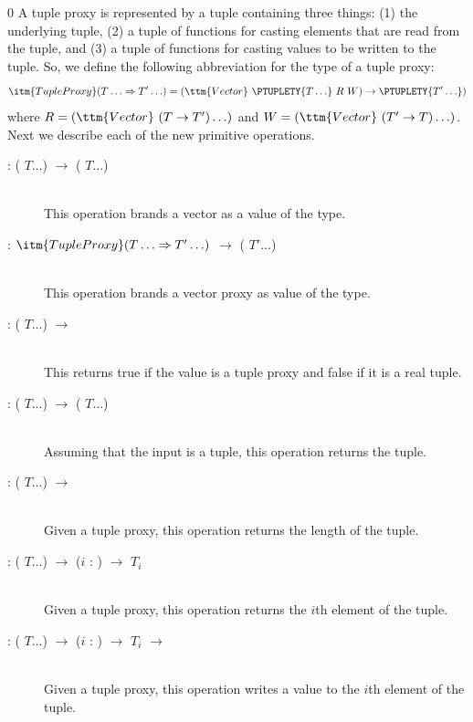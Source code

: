 \documentclass[7x10]{TimesAPriori_MIT}%
\def\racketEd{0}
\def\edition{1}
\numberwithin{theorem}{chapter}
\numberwithin{definition}{chapter}
\numberwithin{equation}{chapter}
\begin{document}
{\if\edition\racketEd    
A tuple proxy is represented by a tuple containing three things: (1) the
underlying tuple, (2) a tuple of functions for casting elements that
are read from the tuple, and (3) a tuple of functions for casting
values to be written to the tuple. So, we define the following
abbreviation for the type of a tuple proxy:
\[
\itm{TupleProxy} (T\ldots \Rightarrow T'\ldots)
= (\ttm{Vector}~\PTUPLETY{T\ldots} ~R~ W) \to \PTUPLETY{T' \ldots})
\]
where $R = (\ttm{Vector}~(T\to T') \ldots)$ and
$W = (\ttm{Vector}~(T'\to T) \ldots)$.
%
Next we describe each of the new primitive operations.

\begin{description}
\item[ : ( $T \ldots$) $\to$
  ( $T \ldots$)]\ \\
%
  This operation brands a vector as a value of the  type.
\item[ : $\itm{TupleProxy}(T\ldots \Rightarrow T'\ldots)$
  $\to$ ( $T' \ldots$)]\ \\
%
  This operation brands a vector proxy as value of the  type.
\item[ : ( $T \ldots$) $\to$
  \BOOLTY{}] \ \\
%
  This returns true if the value is a tuple proxy and false if it is a
  real tuple.
\item[ : ( $T \ldots$) $\to$
  ( $T \ldots$)]\ \\
%
  Assuming that the input is a tuple, this operation returns the
  tuple.
  
\item[ : ( $T \ldots$)
  $\to$ \BOOLTY{}]\ \\
%
  Given a tuple proxy, this operation returns the length of the tuple.
  
\item[ : ( $T \ldots$)
  $\to$ ($i$ : ) $\to$ $T_i$]\ \\
%
  Given a tuple proxy, this operation returns the $i$th element of the
  tuple.
  
\item[ : ( $T \ldots$) $\to$ ($i$
  : ) $\to$ $T_i$ $\to$ ]\ \\
  Given a tuple proxy, this operation writes a value to the $i$th element
  of the tuple.
\end{description}
\fi}
\end{document}
